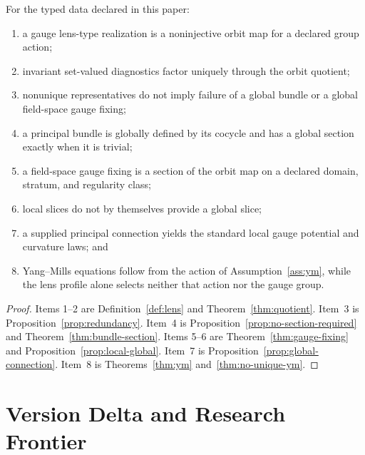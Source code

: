 \documentclass[11pt]{article}
\begin{document}
\begin{theorem}
\label{thm:scoped}
For the typed data declared in this paper:
\begin{enumerate}
\item a gauge lens-type realization is a noninjective orbit map for a declared
group action;
\item invariant set-valued diagnostics factor uniquely through the orbit
quotient;
\item nonunique representatives do not imply failure of a global bundle or a
global field-space gauge fixing;
\item a principal bundle is globally defined by its cocycle and has a global
section exactly when it is trivial;
\item a field-space gauge fixing is a section of the orbit map on a declared
domain, stratum, and regularity class;
\item local slices do not by themselves provide a global slice;
\item a supplied principal connection yields the standard local gauge
potential and curvature laws; and
\item Yang--Mills equations follow from the action of
Assumption~\ref{ass:ym}, while the lens profile alone selects neither that
action nor the gauge group.
\end{enumerate}
\end{theorem}

\begin{proof}
Items 1--2 are Definition~\ref{def:lens} and
Theorem~\ref{thm:quotient}.  Item~3 is
Proposition~\ref{prop:redundancy}.  Item~4 is
Proposition~\ref{prop:no-section-required} and
Theorem~\ref{thm:bundle-section}.  Items 5--6 are
Theorem~\ref{thm:gauge-fixing} and
Proposition~\ref{prop:local-global}.  Item~7 is
Proposition~\ref{prop:global-connection}.  Item~8 is
Theorems~\ref{thm:ym} and~\ref{thm:no-unique-ym}.
\end{proof}

\section{Version Delta and Research Frontier}
\end{document}
